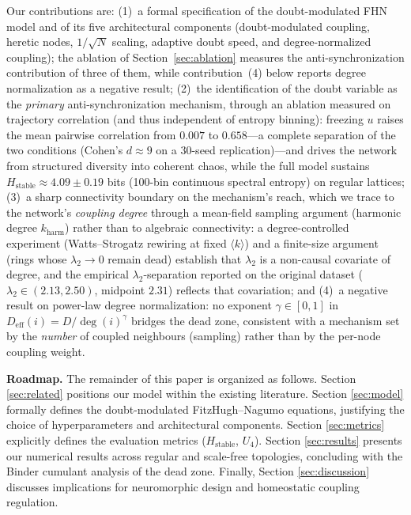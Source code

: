 ﻿\documentclass[11pt]{article}
\begin{document}
Our contributions are: (1)~a formal specification of the doubt-modulated FHN model and of its five architectural components (doubt-modulated coupling, heretic nodes, $1/\sqrt{N}$ scaling, adaptive doubt speed, and degree-normalized coupling); the ablation of Section~\ref{sec:ablation} measures the anti-synchronization contribution of three of them, while contribution~(4) below reports degree normalization as a negative result; (2)~the identification of the doubt variable as the \emph{primary} anti-synchronization mechanism, through an ablation measured on trajectory correlation (and thus independent of entropy binning): freezing $u$ raises the mean pairwise correlation from $0.007$ to $0.658$---a complete separation of the two conditions (Cohen's $d \approx 9$ on a 30-seed replication)---and drives the network from structured diversity into coherent chaos, while the full model sustains $H_{\text{stable}} \approx 4.09 \pm 0.19$ bits (100-bin continuous spectral entropy) on regular lattices; (3)~a sharp connectivity boundary on the mechanism's reach, which we trace to the network's \emph{coupling degree} through a mean-field sampling argument (harmonic degree $k_{\mathrm{harm}}$) rather than to algebraic connectivity: a degree-controlled experiment (Watts--Strogatz rewiring at fixed $\langle k\rangle$) and a finite-size argument (rings whose $\lambda_2 \to 0$ remain dead) establish that $\lambda_2$ is a non-causal covariate of degree, and the empirical $\lambda_2$-separation reported on the original dataset ($\lambda_2 \in (2.13, 2.50)$, midpoint $2.31$) reflects that covariation; and (4)~a negative result on power-law degree normalization: no exponent $\gamma \in [0, 1]$ in $D_{\text{eff}}(i) = D/\deg(i)^\gamma$ bridges the dead zone, consistent with a mechanism set by the \emph{number} of coupled neighbours (sampling) rather than by the per-node coupling weight.

\textbf{Roadmap.} The remainder of this paper is organized as follows. Section \ref{sec:related} positions our model within the existing literature. Section \ref{sec:model} formally defines the doubt-modulated FitzHugh--Nagumo equations, justifying the choice of hyperparameters and architectural components. Section \ref{sec:metrics} explicitly defines the evaluation metrics ($H_{\text{stable}}$, $U_4$). Section \ref{sec:results} presents our numerical results across regular and scale-free topologies, concluding with the Binder cumulant analysis of the dead zone. Finally, Section \ref{sec:discussion} discusses implications for neuromorphic design and homeostatic coupling regulation.
\end{document}
